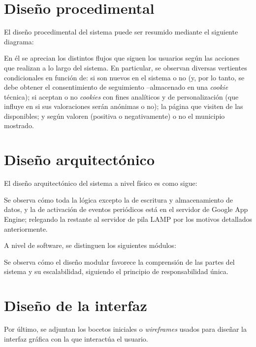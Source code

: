 \section{Diseño procedimental}

El diseño procedimental del sistema puede ser resumido mediante el siguiente diagrama:


En él se aprecian los distintos flujos que siguen los usuarios según las acciones que realizan a lo largo del sistema. En particular, se observan diversas vertientes condicionales en función de: si son nuevos en el sistema o no (y, por lo tanto, se debe obtener el consentimiento de seguimiento –almacenado en una \textit{cookie} técnica); si aceptan o no \textit{cookies} con fines analíticos y de personalización (que influye en si sus valoraciones serán anónimas o no); la página que visiten de las disponibles; y según valoren (positiva o negativamente) o no el municipio mostrado.

\section{Diseño arquitectónico}

El diseño arquitectónico del sistema a nivel físico es como sigue:


Se observa cómo toda la lógica excepto la de escritura y almacenamiento de datos, y la de activación de eventos periódicos está en el servidor de Google App Engine; relegando la restante al servidor de pila LAMP por los motivos detallados anteriormente.

A nivel de software, se distinguen los siguientes módulos:

Se observa cómo el diseño modular favorece la comprensión de las partes del sistema y su escalabilidad, siguiendo el principio de responsabilidad única.

\section{Diseño de la interfaz}

Por último, se adjuntan los bocetos iniciales o \textit{wireframes} usados para diseñar la interfaz gráfica con la que interactúa el usuario.


